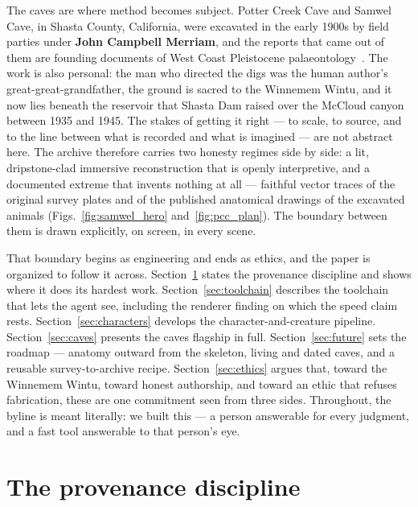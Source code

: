 \documentclass[11pt]{article}
\begin{document}
The caves are where method becomes subject. Potter Creek Cave and Samwel Cave, in Shasta County, California, were excavated in the early 1900s by field parties under \textbf{John Campbell Merriam}, and the reports that came out of them are founding documents of West Coast Pleistocene palaeontology~\cite{sinclair04,sf04,feranec07}. The work is also personal: the man who directed the digs was the human author's great-great-grandfather, the ground is sacred to the Winnemem Wintu, and it now lies beneath the reservoir that Shasta Dam raised over the McCloud canyon between 1935 and 1945. The stakes of getting it right --- to scale, to source, and to the line between what is recorded and what is imagined --- are not abstract here. The archive therefore carries two honesty regimes side by side: a lit, dripstone-clad immersive reconstruction that is openly interpretive, and a documented extreme that invents nothing at all --- faithful vector traces of the original survey plates and of the published anatomical drawings of the excavated animals (Figs.~\ref{fig:samwel_hero} and~\ref{fig:pcc_plan}). The boundary between them is drawn explicitly, on screen, in every scene.

That boundary begins as engineering and ends as ethics, and the paper is organized to follow it across. Section~\ref{sec:provenance} states the provenance discipline and shows where it does its hardest work. Section~\ref{sec:toolchain} describes the toolchain that lets the agent see, including the renderer finding on which the speed claim rests. Section~\ref{sec:characters} develops the character-and-creature pipeline. Section~\ref{sec:caves} presents the caves flagship in full. Section~\ref{sec:future} sets the roadmap --- anatomy outward from the skeleton, living and dated caves, and a reusable survey-to-archive recipe. Section~\ref{sec:ethics} argues that, toward the Winnemem Wintu, toward honest authorship, and toward an ethic that refuses fabrication, these are one commitment seen from three sides. Throughout, the byline is meant literally: we built this --- a person answerable for every judgment, and a fast tool answerable to that person's eye.

\section{The provenance discipline}\label{sec:provenance}
\end{document}
